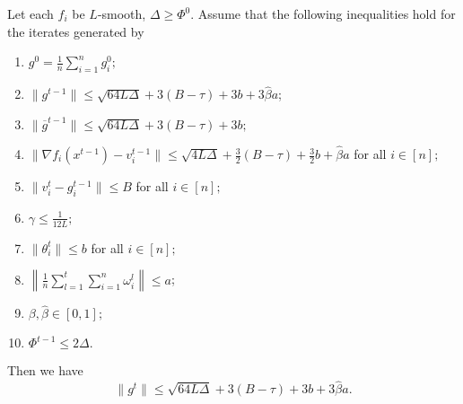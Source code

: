 \documentclass[a4paper,11pt]{article}
\begin{document}
\begin{lemma}\label{lem:bound_gt_norm_dp}
    Let each $f_i$ be $L$-smooth, $\Delta \ge \Phi^0$. 
    Assume that the following inequalities hold for the iterates generated by 
    \begin{enumerate}
        \item $g^0 = \frac{1}{n}\sum_{i=1}^ng_i^0;$
        \item $\|g^{t-1}\| \le \sqrt{64L\Delta} + 3(B-\tau) + 3 b + 3\hat{\beta}a$;
        \item $\|\overline{g}^{t-1}\| \le \sqrt{64L\Delta} + 3(B-\tau) + 3 b;$
        \item 
        $\|\nabla f_i(x^{t-1}) - v_i^{t-1}\| \le \sqrt{4L\Delta} + \frac{3}{2}(B-\tau) + \frac{3}{2} b + \hat{\beta}a$ for all $i\in[n];$
        \item $\|v_i^t - g_i^{t-1}\| \le B$ for all $i\in[n];$
        \item $\gamma \le \frac{1}{12L};$
        \item $\|\theta^t_i\|\le b$ for all $i\in[n];$
        \item $\left\|\frac{1}{n}\sum_{l=1}^{t}\sum_{i=1}^n\omega_i^l\right\| \le a$;
        \item $\beta,\hat{\beta} \in [0,1];$
        \item $\Phi^{t-1} \le 2\Delta.$
    \end{enumerate}
    Then we have 
    \begin{equation}
        \|g^t\| \le \sqrt{64L\Delta} + 3(B-\tau) + 3 b + 3\hat{\beta}a.
    \end{equation}
\end{lemma}
\end{document}
